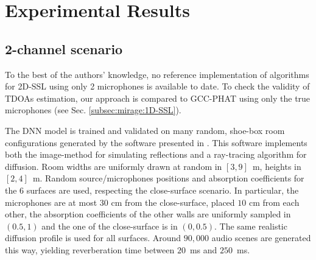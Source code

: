 \section{Experimental Results}\label{sec:mirage:exp}

\subsection{2-channel scenario}
To the best of the authors' knowledge, no reference implementation of algorithms for 2D-SSL using only 2 microphones is available to date.
To check the validity of \ac{TDOA}s estimation, our approach is compared to \ac{GCC-PHAT} using only the true microphones (see Sec. \cref{subsec:mirage:1D-SSL}).

\mynewline
The \ac{DNN} model is trained and validated on many random, shoe-box room configurations generated by the software presented in .
This software implements both the image-method for simulating reflections and a ray-tracing algorithm for diffusion.
Room widths are uniformly drawn at random in $[3, 9]$~m, heights in $[2, 4]$~m.
Random source/microphones positions and absorption coefficients for the 6 surfaces are used,
respecting the close-surface scenario. In particular, the microphones are at most $30$ cm from the close-surface,
placed $10$ cm from each other, the absorption coefficients of the other walls are
uniformly sampled in $(0.5, 1)$ and the one of the close-surface is in $(0, 0.5)$.
The same realistic diffusion profile  is used for all surfaces.
Around $90,000$ audio scenes are generated this way, yielding reverberation time \RT{} between $20$~ms and $250$~ms.


